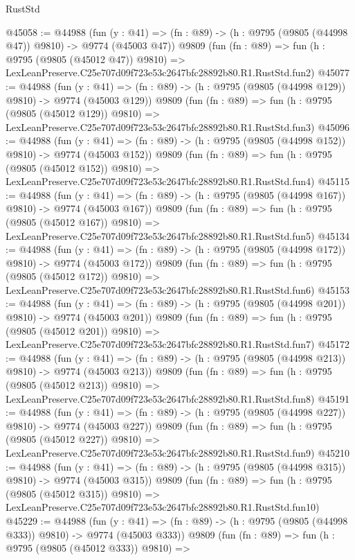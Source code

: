 \begin{lexlean}{RustStd}
\begin{coremodule}
@45058 := @44988
    (fun (y : @41) => (fn : @89) -> (h : @9795 (@9805 (@44998 @47)) @9810) -> @9774 (@45003 @47))
    @9809
    (fun (fn : @89) =>
    fun (h : @9795 (@9805 (@45012 @47)) @9810) =>
    LexLeanPreserve.C25e707d09f723e53c2647bfc28892b80.R1.RustStd.fun2)
@45077 := @44988
    (fun (y : @41) => (fn : @89) -> (h : @9795 (@9805 (@44998 @129)) @9810) -> @9774 (@45003 @129))
    @9809
    (fun (fn : @89) =>
    fun (h : @9795 (@9805 (@45012 @129)) @9810) =>
    LexLeanPreserve.C25e707d09f723e53c2647bfc28892b80.R1.RustStd.fun3)
@45096 := @44988
    (fun (y : @41) => (fn : @89) -> (h : @9795 (@9805 (@44998 @152)) @9810) -> @9774 (@45003 @152))
    @9809
    (fun (fn : @89) =>
    fun (h : @9795 (@9805 (@45012 @152)) @9810) =>
    LexLeanPreserve.C25e707d09f723e53c2647bfc28892b80.R1.RustStd.fun4)
@45115 := @44988
    (fun (y : @41) => (fn : @89) -> (h : @9795 (@9805 (@44998 @167)) @9810) -> @9774 (@45003 @167))
    @9809
    (fun (fn : @89) =>
    fun (h : @9795 (@9805 (@45012 @167)) @9810) =>
    LexLeanPreserve.C25e707d09f723e53c2647bfc28892b80.R1.RustStd.fun5)
@45134 := @44988
    (fun (y : @41) => (fn : @89) -> (h : @9795 (@9805 (@44998 @172)) @9810) -> @9774 (@45003 @172))
    @9809
    (fun (fn : @89) =>
    fun (h : @9795 (@9805 (@45012 @172)) @9810) =>
    LexLeanPreserve.C25e707d09f723e53c2647bfc28892b80.R1.RustStd.fun6)
@45153 := @44988
    (fun (y : @41) => (fn : @89) -> (h : @9795 (@9805 (@44998 @201)) @9810) -> @9774 (@45003 @201))
    @9809
    (fun (fn : @89) =>
    fun (h : @9795 (@9805 (@45012 @201)) @9810) =>
    LexLeanPreserve.C25e707d09f723e53c2647bfc28892b80.R1.RustStd.fun7)
@45172 := @44988
    (fun (y : @41) => (fn : @89) -> (h : @9795 (@9805 (@44998 @213)) @9810) -> @9774 (@45003 @213))
    @9809
    (fun (fn : @89) =>
    fun (h : @9795 (@9805 (@45012 @213)) @9810) =>
    LexLeanPreserve.C25e707d09f723e53c2647bfc28892b80.R1.RustStd.fun8)
@45191 := @44988
    (fun (y : @41) => (fn : @89) -> (h : @9795 (@9805 (@44998 @227)) @9810) -> @9774 (@45003 @227))
    @9809
    (fun (fn : @89) =>
    fun (h : @9795 (@9805 (@45012 @227)) @9810) =>
    LexLeanPreserve.C25e707d09f723e53c2647bfc28892b80.R1.RustStd.fun9)
@45210 := @44988
    (fun (y : @41) => (fn : @89) -> (h : @9795 (@9805 (@44998 @315)) @9810) -> @9774 (@45003 @315))
    @9809
    (fun (fn : @89) =>
    fun (h : @9795 (@9805 (@45012 @315)) @9810) =>
    LexLeanPreserve.C25e707d09f723e53c2647bfc28892b80.R1.RustStd.fun10)
@45229 := @44988
    (fun (y : @41) => (fn : @89) -> (h : @9795 (@9805 (@44998 @333)) @9810) -> @9774 (@45003 @333))
    @9809
    (fun (fn : @89) =>
    fun (h : @9795 (@9805 (@45012 @333)) @9810) =>

\end{coremodule}
\end{lexlean}
